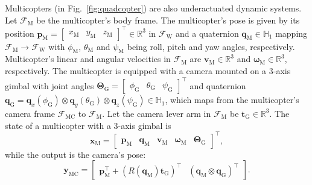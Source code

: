 \documentclass[letterpaper, 10 pt, conference]{ieeeconf}  %
\begin{document}
Multicopters (in Fig.~\ref{fig:quadcopter}) are also underactuated dynamic systems. 
Let $\mathcal{F}_\text{M}$ be the multicopter's body frame. The multicopter's pose is given by its position $\mathbf p_\text{M} = \begin{bmatrix} x_\text{M} & y_\text{M} & z_\text{M} \end{bmatrix}^\top \in \mathbb{R}^3$ in $\mathcal F_\text{W}$ and a quaternion $\mathbf q_\text{M} \in \mathbb{H}_1$ mapping $\mathcal F_\text{M} \to \mathcal F_\text{W}$ with $\phi_\text{M}$, $\theta_\text{M}$ and $\psi_\text{M}$ being roll, pitch and yaw angles, respectively. 
Multicopter's linear and angular velocities in $\mathcal{F}_\text{M}$ are $\mathbf{v}_\text{M} \in \mathbb{R}^3$ and $\boldsymbol{\omega}_\text{M} \in \mathbb{R}^3$, respectively.
The multicopter is equipped with a camera mounted on a 3-axis gimbal with joint angles $\boldsymbol{\Theta}_\text{G} = \begin{bmatrix} \phi_\text{G} & \theta_\text{G} & \psi_\text{G} \end{bmatrix}^\top$ and quaternion $\mathbf{q}_\text{G} = \mathbf{q}_x(\phi_\text{G}) \otimes \mathbf{q}_y(\theta_\text{G}) \otimes \mathbf{q}_z(\psi_\text{G}) \in \mathbb{H}_1$, which maps from the multicopter's camera frame $\mathcal{F}_\text{MC}$ to $\mathcal{F}_\text{M}$. Let the camera lever arm in $\mathcal{F}_\text{M}$ be $\mathbf{t}_\text{G} \in \mathbb{R}^3$.
The state of a multicopter with a 3-axis gimbal is
\begin{equation}
\mathbf{x}_\text{M} = \begin{bmatrix} \mathbf{p}_\text{M} & \mathbf{q}_\text{M} & \mathbf{v}_\text{M} & \boldsymbol{\omega}_\text{M} & \boldsymbol{\Theta}_\text{G} \end{bmatrix}^\top,
\label{eq:quad_x}
\end{equation}
while the output is the camera's pose:
\begin{equation}
\mathbf{y}_\text{MC} = \begin{bmatrix} \mathbf{p}_\text{M}^\top + \left( R\left(\mathbf{q}_\text{M}\right) \mathbf{t}_\text{G} \right)^\top & \left( \mathbf{q}_\text{M} \otimes \mathbf{q}_\text{G} \right)^\top \end{bmatrix}.
\label{eq:gimbal_y}
\end{equation}
\end{document}
